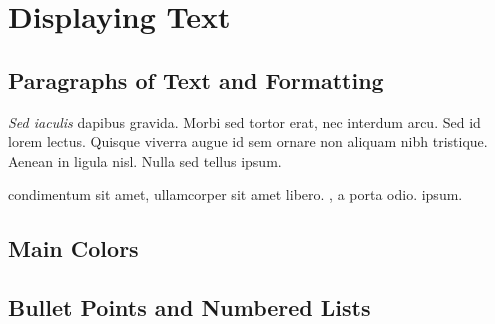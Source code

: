 \section{Displaying Text}
\label{section1}
\renewcommand*{\runninghead}{\nameref{section1}} %

\clearpage


\subsection{Paragraphs of Text and Formatting}

\textit{Sed iaculis} dapibus gravida. Morbi sed tortor erat, nec interdum arcu. Sed id lorem lectus. Quisque viverra augue id sem ornare non aliquam nibh tristique. Aenean in ligula nisl. Nulla sed tellus ipsum.

\begin{multicols}{2} %
     condimentum sit amet, ullamcorper sit amet libero.
    , a porta odio.
     ipsum.
\end{multicols}

\clearpage


\subsection{Main Colors}

\crule[cprimary]{2cm}{2cm} \crule[csecondary]{2cm}{2cm} \crule[chighlight]{2cm}{2cm}

\clearpage

\subsection{Bullet Points and Numbered Lists}

